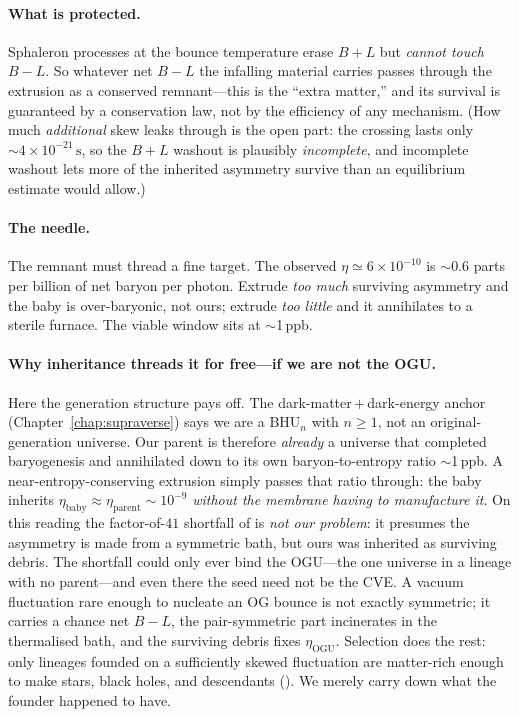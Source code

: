 \paragraph{What is protected.} Sphaleron processes at the bounce temperature erase
$B{+}L$ but \emph{cannot touch} $B{-}L$. So whatever net $B{-}L$ the infalling
material carries passes through the extrusion as a conserved remnant---this is the
``extra matter,'' and its survival is guaranteed by a conservation law, not by the
efficiency of any mechanism. (How much \emph{additional} skew leaks through is the
open part: the crossing lasts only $\sim4\times10^{-21}\,\mathrm{s}$, so the
$B{+}L$ washout is plausibly \emph{incomplete}, and incomplete washout lets more of
the inherited asymmetry survive than an equilibrium estimate would allow.)

\paragraph{The needle.} The remnant must thread a fine target. The observed
$\eta\simeq6\times10^{-10}$ is $\sim$0.6 parts per billion of net baryon per
photon. Extrude \emph{too much} surviving asymmetry and the baby is over-baryonic,
not ours; extrude \emph{too little} and it annihilates to a sterile furnace. The
viable window sits at $\sim$1\,ppb.

\paragraph{Why inheritance threads it for free---if we are not the OGU.} Here the
generation structure pays off. The dark-matter\,$+$\,dark-energy anchor
(Chapter~\ref{chap:supraverse}) says we are a $\mathrm{BHU}_n$ with $n\ge1$, not an
original-generation universe. Our parent is therefore \emph{already} a universe
that completed baryogenesis and annihilated down to its own baryon-to-entropy
ratio $\sim$1\,ppb. A near-entropy-conserving extrusion simply passes that ratio
through: the baby inherits $\eta_{\mathrm{baby}}\approx\eta_{\mathrm{parent}}\sim
10^{-9}$ \emph{without the membrane having to manufacture it}. On this reading the
factor-of-$41$ shortfall of  is \emph{not our problem}: it
presumes the asymmetry is made from a symmetric bath, but ours was inherited as
surviving debris. The shortfall could only ever bind the OGU---the one universe in
a lineage with no parent---and even there the seed need not be the CVE. A vacuum
fluctuation rare enough to nucleate an OG bounce is not exactly symmetric; it
carries a chance net $B{-}L$, the pair-symmetric part incinerates in the
thermalised bath, and the surviving debris fixes $\eta_{\mathrm{OGU}}$. Selection
does the rest: only lineages founded on a sufficiently skewed fluctuation are
matter-rich enough to make stars, black holes, and descendants
(). We merely carry down what the founder happened to
have.

